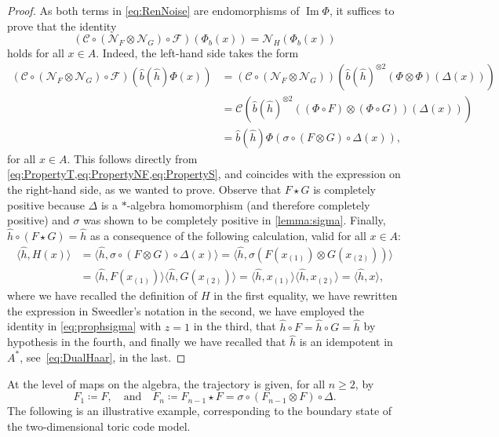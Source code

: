 \documentclass[a4paper,10pt]{amsart}
\newcommand{\Fine}{\mathcal{F}}
\newcommand{\Coarse}{\mathcal{C}}
\newcommand{\Noisy}{\mathcal{N}}
\newcommand{\eval}[2]{\langle #1 , #2\rangle}
\theoremstyle{definition}
\begin{document}
\begin{proof}
	As both terms in \cref{eq:RenNoise} are endomorphisms of $\operatorname{Im}\Phi$, it suffices to prove that the identity
	\[
		(\Coarse
            \circ ({\Noisy}_{F}\otimes \Noisy_G)
            \circ \Fine)(\Phi_b(x))
		=
        \Noisy_H(\Phi_b(x))
	\]
	holds for all $x\in A$.
	Indeed, the left-hand side takes the form
	\begin{align*}
		(\Coarse
            \circ ({\Noisy}_{F}\otimes \Noisy_G)
            \circ \Fine)
                (\hat{b}(\hat{h})\Phi(x))
		  & =
		(\Coarse \circ ({\Noisy}_{F}\otimes \Noisy_G))
            (\hat{b}(\hat{h})^{\otimes 2}(\Phi\otimes \Phi)(\Delta(x)))
		\\ &
        =
		\Coarse(\hat{b}(\hat{h})^{\otimes 2}((\Phi\circ F)\otimes (\Phi\circ G))(\Delta(x)))
		\\ &
        =
		\hat{b}(\hat{h}) \Phi( \sigma \circ (F \otimes G)\circ \Delta(x) ),
	\end{align*}
	for all $x\in A$. This follows directly from \cref{eq:PropertyT,eq:PropertyNF,eq:PropertyS}, and coincides with the expression on the right-hand side, as we wanted to prove. Observe that $F\star G$ is completely positive because $\Delta$ is a $*$-algebra homomorphism (and therefore completely positive) and $\sigma$ was shown to be completely positive in \cref{lemma:sigma}.
	Finally, $\hat{h}\circ (F\star G) = \hat{h}$ as a consequence of the following calculation, valid for all $x\in A$:
	\begin{align*}
		\eval{\hat{h}}{H(x)}
		  & =
		\eval{\hat{h}}{\sigma \circ (F\otimes G)\circ \Delta(x)}
		=
		\eval{\hat{h}}{\sigma(F(x_{(1)})\otimes G(x_{(2)}))}
		\\ &
        =
		\eval{\hat{h}}{F(x_{(1)})}
            \eval{\hat{h}}{G(x_{(2)})}
		=
		\eval{\hat{h}}{x_{(1)}}
            \eval{\hat{h}}{x_{(2)}} 
        =
        \eval{\hat{h}}{x},
	\end{align*}
	where we have recalled the definition of $H$ in the first equality, we have rewritten the expression in Sweedler's notation in the second, we have employed the identity in \cref{eq:prophsigma} with $z = 1$ in the third, that $\hat{h}\circ F = \hat{h}\circ G = \hat{h}$ by hypothesis in the fourth, and finally we have recalled that $\hat{h}$ is an idempotent in $A^*$, see~\cref{eq:DualHaar}, in the last.
\end{proof}

At the level of maps on the algebra, the trajectory is given, for all $n\geq 2$, by
\begin{equation}
    F_{1} \coloneqq F
    , \quad \text{and} \quad
    F_{n} \coloneqq F_{n-1}\star F
         = \sigma \circ ( F_{n-1} \otimes F)\circ \Delta.
\end{equation}
The following is an illustrative example, corresponding to the boundary state of the two-dimensional toric code model.
\end{document}
